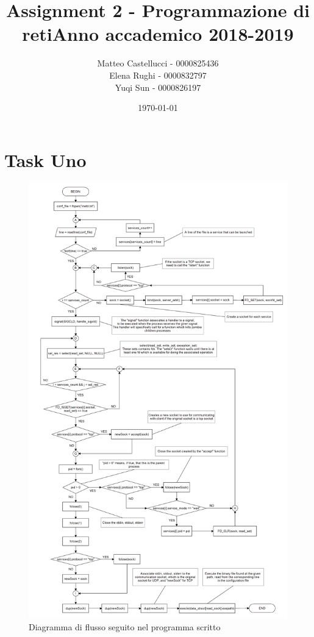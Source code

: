 \documentclass[a4paper, 12pt]{report}
\title{Assignment 2 - Programmazione di reti\newline Anno accademico 2018-2019}
\date{\today}
\author{Matteo Castellucci - 0000825436\\Elena Rughi - 0000832797\\Yuqi Sun - 0000826197\newline}
\begin{document}
\maketitle
\tableofcontents

\chapter{Task Uno}

\begin{figure}[H]
	\centering
	\includegraphics[width=\linewidth]{images/diagram.png}
	\caption{Diagramma di flusso seguito nel programma scritto}
\end{figure}
\end{document}
